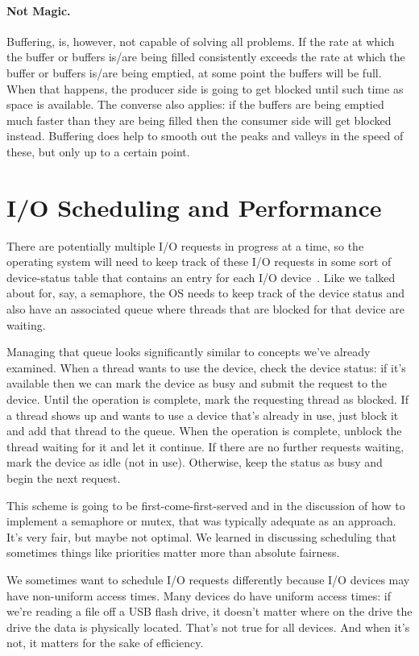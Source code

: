 \paragraph{Not Magic.}
Buffering, is, however, not capable of solving all problems. If the rate at which the buffer or buffers is/are being filled consistently exceeds the rate at which the  buffer or buffers is/are being emptied, at some point the buffers will be full. When that happens, the producer side is going to get blocked until such time as space is available. The converse also applies: if the buffers are being emptied much faster than they are being filled then the consumer side will get blocked instead. Buffering does help to smooth out the peaks and valleys in the speed of these, but only up to a certain point.


\section*{I/O Scheduling and Performance}

There are potentially multiple I/O requests in progress at a time, so the operating system will need to keep track of these I/O requests in some sort of device-status table that contains an entry for each I/O device~\cite{osc}. Like we talked about for, say, a semaphore, the OS needs to keep track of the device status and also have an associated queue where threads that are blocked for that device are waiting.

Managing that queue looks significantly similar to concepts we've already examined. When a thread wants to use the device, check the device status: if it's available then we can mark the device as busy and submit the request to the device. Until the operation is complete, mark the requesting thread as blocked. If a thread shows up and wants to use a device that's already in use, just block it and add that thread to the queue. When the operation is complete, unblock the thread waiting for it and let it continue. If there are no further requests waiting, mark the device as idle (not in use). Otherwise, keep the status as busy and begin the next request.

This scheme is going to be first-come-first-served and in the discussion of how to implement a semaphore or mutex, that was typically adequate as an approach. It's very fair, but maybe not optimal. We learned in discussing scheduling that sometimes things like priorities matter more than absolute fairness.

We sometimes want to schedule I/O requests differently because I/O devices may have non-uniform access times. Many devices do have uniform access times: if we're reading a file off a USB flash drive, it doesn't matter where on the drive the drive the data is physically located. That's not true for all devices. And when it's not, it matters for the sake of efficiency.

